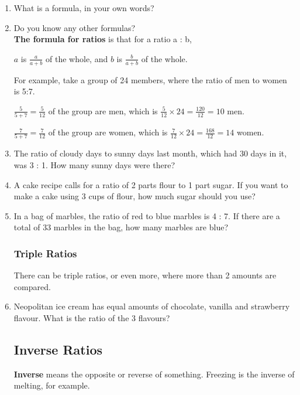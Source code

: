 \documentclass{article}
\begin{document}
\begin{spacing}{1.25}
\begin{enumerate}
\item What is a formula, in your own words?
\item Do you know any other formulas?\\

\textbf{The formula for ratios} is that for a ratio a : b,

\begin{center}
$a$ is $\frac{a}{a+b}$ of the whole,
\vspace{16pt}
and $b$ is $\frac{b}{a+b}$ of the whole.
\end{center}

For example, take a group of 24 members, where the ratio of men to women is 5:7.

$\frac{5}{5+7} = \frac{5}{12}$ of the group are men, which is $\frac{5}{12} \times 24=\frac{120}{12}=10$ men.

$\frac{7}{5+7} =\frac{7}{12}$ of the group are women, which is $\frac{7}{12} \times 24=\frac{168}{12}=14$ women.

\item The ratio of cloudy days to sunny days last month, which had 30 days in it, was 3 : 1. How many sunny days were there?

\item A cake recipe calls for a ratio of 2 parts flour to 1 part sugar. If you want to make a cake using 3 cups of flour, how much sugar should you use?

\item In a bag of marbles, the ratio of red to blue marbles is 4 : 7. If there are a total of 33 marbles in the bag, how many marbles are blue?

\subsubsection*{Triple Ratios}
There can be triple ratios, or even more, where more than 2 amounts are compared.\\

\item Neopolitan ice cream has equal amounts of chocolate, vanilla and strawberry flavour. What is the ratio of the 3 flavours?

\subsection*{Inverse Ratios}

\textbf{Inverse} means the opposite or reverse of something. Freezing is the inverse of melting, for example.


\end{enumerate}
\end{spacing}
\end{document}

